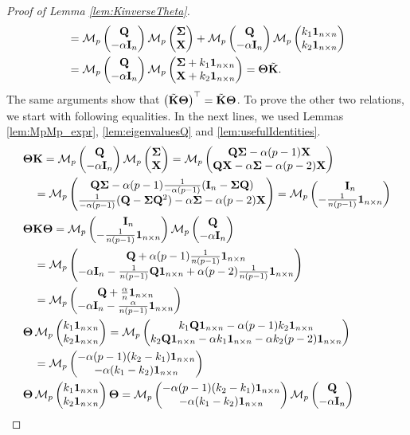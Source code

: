 \documentclass[12pt]{article}
\theoremstyle{plain}
\theoremstyle{remark}
\newcommand{\round}[1]{\left( #1 \right)}
\newcommand{\Mv}[3]{\mathcal{M}_{#1}\begin{pmatrix}
	#2\\
	#3
\end{pmatrix}}
\newcommand{\onenn}[0]{{\mathbf{1}_{n\times n}}}
\newcommand{\latMatr}[1]{\mathbf{#1}}          %
\newcommand{\grMatr}[1]{{\boldsymbol{#1}}}   %
\begin{document}
\begin{proof}[Proof of Lemma \ref{lem:KinverseTheta}]
\begin{align*}
            &=\Mv{p}{{\latMatr Q}}{-\alpha \latMatr{I}_n} \Mv{p}{{\grMatr{\Sigma}}}{\latMatr X} + \Mv{p}{{\latMatr Q}}{-\alpha \latMatr{I}_n} \Mv{p}{k_1 \onenn}{k_2 \onenn}\\
            &=\Mv{p}{{\latMatr Q}}{-\alpha \latMatr{I}_n} \Mv{p}{{\grMatr{\Sigma}} + k_1 \onenn}{\latMatr X + k_2 \onenn} = \grMatr{\Theta} \Tilde{\latMatr K}.
        \end{align*}
        The same arguments show that $\round{\Tilde{\latMatr K} \grMatr{\Theta}}^\top = \Tilde{\latMatr K} \grMatr{\Theta}$. To prove the other two relations, we start with following equalities. In the next lines, we used Lemmas \ref{lem:MpMp_expr}, \ref{lem:eigenvaluesQ} and \ref{lem:usefulIdentities}.
        \begin{align*}
            \allowdisplaybreaks
            &\grMatr{\Theta} \latMatr{K}=\Mv{p}{{\latMatr Q}}{-\alpha \latMatr{I}_n} \Mv{p}{{\grMatr{\Sigma}}}{\latMatr X}=\Mv{p}{{\latMatr Q}{\grMatr{\Sigma}} - \alpha(p-1)\latMatr X}{{\latMatr Q}\latMatr X-\alpha {\grMatr{\Sigma}}-\alpha(p-2)\latMatr X}\\
            &\quad=\Mv{p}{{\latMatr Q}{\grMatr{\Sigma}} -\alpha(p-1)\frac{1}{-\alpha(p-1)}(\latMatr{I}_n-{\grMatr{\Sigma}} {\latMatr Q})}{\frac{1}{-\alpha(p-1)}({\latMatr Q}-{\grMatr{\Sigma}} {\latMatr Q}^2)-\alpha{\grMatr{\Sigma}} -\alpha(p-2)\latMatr X}=\Mv{p}{\latMatr{I}_n}{-\frac{1}{n(p-1)}\onenn}\\
            &\grMatr{\Theta} \latMatr{K} \grMatr{\Theta} = \Mv{p}{\latMatr{I}_n}{-\frac{1}{n(p-1)}\onenn} \Mv{p}{{\latMatr Q}}{-\alpha \latMatr{I}_n}\\
            &\quad = \Mv{p}{{\latMatr Q}+\alpha (p-1)\frac{1}{n(p-1)}\onenn}{-\alpha \latMatr{I}_n - \frac{1}{n(p-1)}{\latMatr Q}\onenn + \alpha(p-2)\frac{1}{n(p-1)}\onenn}\\
            &\quad =\Mv{p}{{\latMatr Q}+\frac{\alpha}{n}\onenn}{-\alpha \latMatr{I}_n -\frac{\alpha}{n(p-1)}\onenn}\\
            &\grMatr{\Theta}\, \Mv{p}{k_1 \onenn}{k_2 \onenn} = \Mv{p}{k_1 {\latMatr Q} \onenn-\alpha (p-1) k_2 \onenn}{k_2 {\latMatr Q} \onenn - \alpha k_1 \onenn - \alpha k_2 (p-2)\onenn}\\
            &\quad=\Mv{p}{-\alpha(p-1)(k_2-k_1) \onenn}{-\alpha (k_1-k_2)\onenn}\\
            &\grMatr{\Theta}\, \Mv{p}{k_1 \onenn}{k_2 \onenn} \grMatr{\Theta} = \Mv{p}{-\alpha(p-1)(k_2-k_1) \onenn}{-\alpha (k_1-k_2)\onenn} \Mv{p}{{\latMatr Q}}{-\alpha \latMatr{I}_n} \\

\end{align*}
\end{proof}
\end{document}
